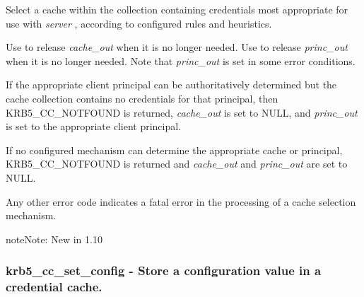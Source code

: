 \documentclass[letterpaper,10pt,english]{sphinxmanual}
\begin{document}
Select a cache within the collection containing credentials most appropriate for use with \emph{server} , according to configured rules and heuristics.

Use {\hyperref[appdev/refs/api/krb5_cc_close:c.krb5_cc_close]{}} to release \emph{cache\_out} when it is no longer needed. Use {\hyperref[appdev/refs/api/krb5_free_principal:c.krb5_free_principal]{}} to release \emph{princ\_out} when it is no longer needed. Note that \emph{princ\_out} is set in some error conditions.

If the appropriate client principal can be authoritatively determined but the cache collection contains no credentials for that principal, then KRB5\_CC\_NOTFOUND is returned, \emph{cache\_out} is set to NULL, and \emph{princ\_out} is set to the appropriate client principal.

If no configured mechanism can determine the appropriate cache or principal, KRB5\_CC\_NOTFOUND is returned and \emph{cache\_out} and \emph{princ\_out} are set to NULL.

Any other error code indicates a fatal error in the processing of a cache selection mechanism.

\begin{notice}{note}{Note:}
New in 1.10
\end{notice}


\subsubsection{krb5\_cc\_set\_config -  Store a configuration value in a credential cache.}
\label{appdev/refs/api/krb5_cc_set_config::doc}\label{appdev/refs/api/krb5_cc_set_config:krb5-cc-set-config-store-a-configuration-value-in-a-credential-cache}

\begin{fulllineitems}
\label{appdev/refs/api/krb5_cc_set_config:c.krb5_cc_set_config}
\end{fulllineitems}
\end{document}
